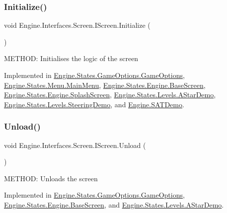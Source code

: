 \subsubsection{\texorpdfstring{Initialize()}{Initialize()}}
{\footnotesize\ttfamily void Engine.\+Interfaces.\+Screen.\+I\+Screen.\+Initialize (\begin{DoxyParamCaption}{ }\end{DoxyParamCaption})}



M\+E\+T\+H\+OD\+: Initialises the logic of the screen 



Implemented in \hyperlink{a00558_a1547a699546baa41aa39a2e2b4412787}{Engine.\+States.\+Game\+Options.\+Game\+Options}, \hyperlink{a00574_a43b83f0941e721234fdceeb0b5587f1b}{Engine.\+States.\+Menu.\+Main\+Menu}, \hyperlink{a00550_af8fd6890abf865641e190578ef2e054c}{Engine.\+States.\+Engine.\+Base\+Screen}, \hyperlink{a00554_a321c34cdc158a49cf76f31e3cdd0863e}{Engine.\+States.\+Engine.\+Splash\+Screen}, \hyperlink{a00562_a143dfe5c81e8cd31fe6439aad1de00c6}{Engine.\+States.\+Levels.\+A\+Star\+Demo}, \hyperlink{a00570_a3ae8b73b4618e8c2635d3b8c24d70bcb}{Engine.\+States.\+Levels.\+Steering\+Demo}, and \hyperlink{a00566_a051d8aea070a4c7a93f0cf494e4fac6a}{Engine.\+S\+A\+T\+Demo}.

\mbox{\label{a00466_a67f1b5deb3604a417d7452fc8873de37}} 
\subsubsection{\texorpdfstring{Unload()}{Unload()}}
{\footnotesize\ttfamily void Engine.\+Interfaces.\+Screen.\+I\+Screen.\+Unload (\begin{DoxyParamCaption}{ }\end{DoxyParamCaption})}



M\+E\+T\+H\+OD\+: Unloads the screen 



Implemented in \hyperlink{a00558_aedf1c1415b77bf7c8ce37d754039de7b}{Engine.\+States.\+Game\+Options.\+Game\+Options}, \hyperlink{a00550_a861ab6364e68e3e3b6b9718e34ba18a2}{Engine.\+States.\+Engine.\+Base\+Screen}, and \hyperlink{a00562_a25e822fbb0f806e84f05a26852c05593}{Engine.\+States.\+Levels.\+A\+Star\+Demo}.

